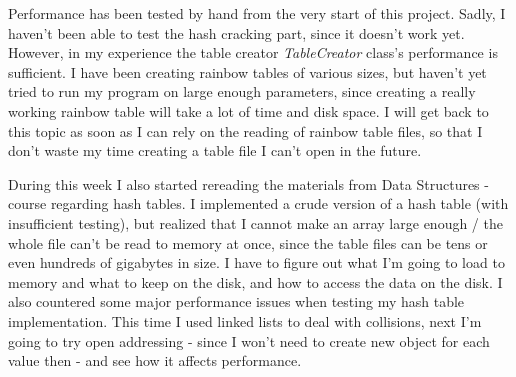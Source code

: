 \documentclass[a4paper, 11pt, finnish]{article}
\begin{document}
Performance has been tested by hand from the very start of this project. Sadly, I haven't been able to test the hash cracking part, since it doesn't work yet. However, in my experience the table creator \emph{TableCreator} class's performance is sufficient. I have been creating rainbow tables of various sizes, but haven't yet tried to run my program on large enough parameters, since creating a really working rainbow table will take a lot of time and disk space. I will get back to this topic as soon as I can rely on the reading of rainbow table files, so that I don't waste my time creating a table file I can't open in the future.

During this week I also started rereading the materials from Data Structures -course regarding hash tables. I implemented a crude version of a hash table (with insufficient testing), but realized that I cannot make an array large enough / the whole file can't be read to memory at once, since the table files can be tens or even hundreds of gigabytes in size. I have to figure out what I'm going to load to memory and what to keep on the disk, and how to access the data on the disk. I also countered some major performance issues when testing my hash table implementation. This time I used linked lists to deal with collisions, next I'm going to try open addressing - since I won't need to create new object for each value then - and see how it affects  performance.
\end{document}
